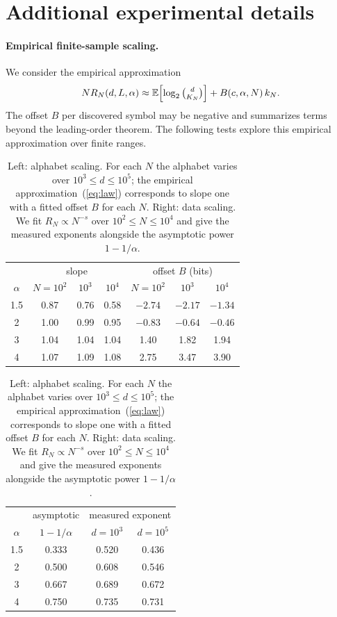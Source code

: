 \documentclass[anon]{alt2027}
\newcommand{\E}{\mathbb{E}}
\renewcommand{\eqref}[1]{(\ref{#1})}
\begin{document}
\section{Additional experimental details}
\label{app:experiments} \suppressfloats[t]

\paragraph{Empirical finite-sample scaling.}
We consider the empirical approximation
\begin{equation}
\label{eq:law}
N R_N(d,L,\alpha)\approx\E\Bigl[\log_2\tbinom{d}{K_N}\Bigr]+B(c,\alpha,N)\,k_N.
\end{equation}
The offset $B$ per discovered symbol may be negative and summarizes terms beyond the leading-order theorem. The following tests explore this empirical approximation over finite ranges.

 

\begin{table}[t]
\centering
\caption{Left: alphabet scaling. For each $N$ the alphabet varies over $10^3\le d\le10^5$; the empirical approximation~\eqref{eq:law} corresponds to slope one with a fitted offset $B$ for each $N$. Right: data scaling. We fit $R_N\propto N^{-s}$ over $10^2\le N\le10^4$ and give the measured exponents alongside the asymptotic power $1-1/\alpha$.}
\label{tab:alphabet}\label{tab:data}
\footnotesize\setlength{\tabcolsep}{3.5pt}
\begin{tabular}{c ccc ccc}
\toprule
& \multicolumn{3}{c}{slope} & \multicolumn{3}{c}{offset $B$ (bits)} \\
$\alpha$ & $N{=}10^2$ & $10^3$ & $10^4$ & $N{=}10^2$ & $10^3$ & $10^4$ \\
\midrule
1.5 & 0.87 & 0.76 & 0.58 & $-2.74$ & $-2.17$ & $-1.34$ \\
2 & 1.00 & 0.99 & 0.95 & $-0.83$ & $-0.64$ & $-0.46$ \\
3 & 1.04 & 1.04 & 1.04 & 1.40 & 1.82 & 1.94 \\
4 & 1.07 & 1.09 & 1.08 & 2.75 & 3.47 & 3.90 \\
\bottomrule
\end{tabular}
\hfill
\begin{tabular}{c c cc}
\toprule
& asymptotic & \multicolumn{2}{c}{measured exponent} \\
$\alpha$ & $1{-}1/\alpha$ & $d=10^3$ & $d=10^5$ \\
\midrule
1.5 & 0.333 & 0.520 & 0.436 \\
2 & 0.500 & 0.608 & 0.546 \\
3 & 0.667 & 0.689 & 0.672 \\
4 & 0.750 & 0.735 & 0.731 \\
\bottomrule
\end{tabular}
\end{table}
\end{document}
